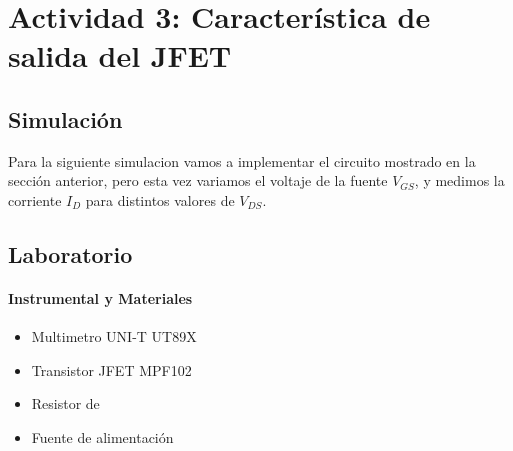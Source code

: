 

\section{Actividad 3: Característica de salida del JFET}

\subsection{Simulación}

Para la siguiente simulacion vamos a implementar el circuito mostrado en la sección anterior, pero esta vez variamos el voltaje de la fuente $V_{GS}$, y medimos la corriente $I_D$ para distintos valores de $V_{DS}$.

\subsection{Laboratorio}

\paragraph{Instrumental y Materiales}
\begin{itemize}
    \item Multimetro UNI-T UT89X
    \item Transistor JFET MPF102
    \item Resistor de
    \item Fuente de alimentación
\end{itemize}


\begin{table}[ht]
\end{table}

